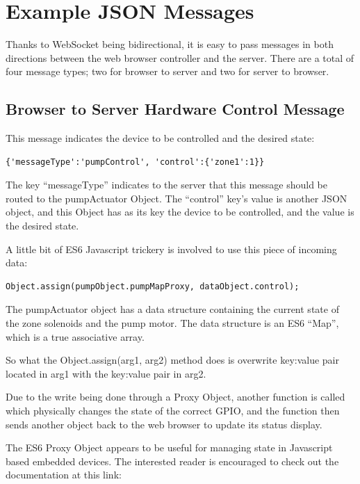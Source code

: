\section{Example JSON Messages}

Thanks to WebSocket being bidirectional, it is easy to pass messages in both 
directions between the web browser controller and the server.  There are a 
total of four message types; two for browser to server and two for server to 
browser.

\subsection{Browser to Server Hardware Control Message}

This message indicates the device to be controlled and the desired state:

\begin{verbatim}
{'messageType':'pumpControl', 'control':{'zone1':1}}
\end{verbatim}

The key ``messageType'' indicates to the server that this message should be 
routed to the pumpActuator Object.  The ``control'' key's value is another JSON 
object, and this Object has as its key the device to be controlled, and the 
value is the desired state.

A little bit of ES6 Javascript trickery is involved to use this piece of 
incoming data:

\begin{verbatim}
Object.assign(pumpObject.pumpMapProxy, dataObject.control);
\end{verbatim}

The pumpActuator object has a data structure containing the current state of 
the zone solenoids and the pump motor.  The data structure is an ES6 ``Map'', 
which is a true associative array.

So what the Object.assign(arg1, arg2) method does is overwrite key:value pair 
located in arg1 with the key:value pair in arg2.

Due to the write being done through a Proxy Object, another function is called 
which physically changes the state of the correct GPIO, and the function then 
sends another object back to the web browser to update its status display.

The ES6 Proxy Object appears to be useful 
for managing state in Javascript based embedded devices.  The interested reader 
is encouraged to check out the documentation at this link:

